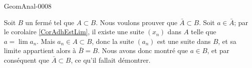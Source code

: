 \begin{corrige}{GeomAnal-0008}

	Soit $B$ un fermé tel que $A\subset B$. Nous voulons prouver que $\bar A\subset B$. Soit $a\in\bar A$; par le corolaire \ref{CorAdhEstLim}, il existe une suite $(x_n)$ dans $A$ telle que $a=\lim a_n$. Mais $a_n\in A\subset B$, donc la suite $(a_n)$ est une suite dans $B$, et sa limite appartient alors à $\bar B=B$. Nous avons donc montré que $a\in B$, et par conséquent que $\bar A\subset B$, ce qu'il fallait démontrer.

\end{corrige}
